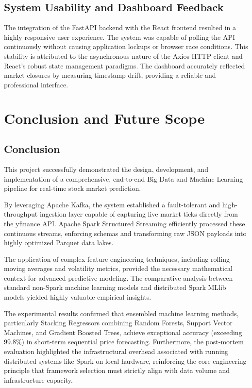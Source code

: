 \documentclass[12pt,a4paper]{report}
\begin{document}
\subsection{System Usability and Dashboard Feedback}

The integration of the FastAPI backend with the React frontend resulted in a highly responsive user experience. The system was capable of polling the API continuously without causing application lockups or browser race conditions. This stability is attributed to the asynchronous nature of the Axios HTTP client and React's robust state management paradigms. The dashboard accurately reflected market closures by measuring timestamp drift, providing a reliable and professional interface.

\clearpage

\section{Conclusion and Future Scope}

\subsection{Conclusion}

This project successfully demonstrated the design, development, and implementation of a comprehensive, end-to-end Big Data and Machine Learning pipeline for real-time stock market prediction. 

By leveraging Apache Kafka, the system established a fault-tolerant and high-throughput ingestion layer capable of capturing live market ticks directly from the yfinance API. Apache Spark Structured Streaming efficiently processed these continuous streams, enforcing schemas and transforming raw JSON payloads into highly optimized Parquet data lakes.

The application of complex feature engineering techniques, including rolling moving averages and volatility metrics, provided the necessary mathematical context for advanced predictive modeling. The comparative analysis between standard non-Spark machine learning models and distributed Spark MLlib models yielded highly valuable empirical insights. 

The experimental results confirmed that ensembled machine learning methods, particularly Stacking Regressors combining Random Forests, Support Vector Machines, and Gradient Boosted Trees, achieve exceptional accuracy (exceeding 99.8\%) in short-term sequential price forecasting. Furthermore, the post-mortem evaluation highlighted the infrastructural overhead associated with running distributed systems like Spark on local hardware, reinforcing the core engineering principle that framework selection must strictly align with data volume and infrastructure capacity.
\end{document}
